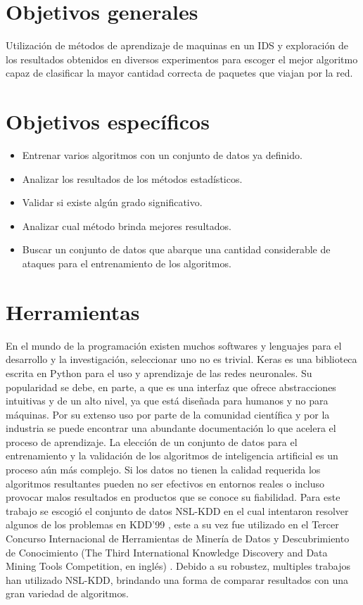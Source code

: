 \section*{Objetivos generales}
Utilización de métodos de aprendizaje de maquinas en un IDS y exploración de los resultados obtenidos en diversos experimentos para escoger el mejor algoritmo capaz de clasificar la mayor cantidad correcta de paquetes que viajan por la red.

\section*{Objetivos específicos}
\begin{itemize}
    \item Entrenar varios algoritmos con un conjunto de datos ya definido.
    \item Analizar los resultados de los métodos estadísticos.
    \item Validar si existe algún grado significativo.
    \item Analizar cual método brinda mejores resultados.
    \item Buscar un conjunto de datos que abarque una cantidad considerable de ataques para el entrenamiento de los algoritmos.
\end{itemize}

\section*{Herramientas}
En el mundo de la programación existen muchos softwares y lenguajes para el desarrollo y la investigación, seleccionar uno no es trivial. Keras \cite{gulli2017deep} es una biblioteca escrita en Python \cite{lutz2001programming} para el uso y aprendizaje de las redes neuronales. Su popularidad se debe, en parte, a que es una interfaz que ofrece abstracciones intuitivas y de un alto nivel, ya que está diseñada para humanos y no para máquinas. Por su extenso uso por parte de la comunidad científica y por la industria se puede encontrar una abundante documentación lo que acelera el proceso de aprendizaje. La elección de un conjunto de datos para el entrenamiento y la validación de los algoritmos de inteligencia artificial es un proceso aún más complejo. Si los datos no tienen la calidad requerida los algoritmos resultantes pueden no ser efectivos en entornos reales o incluso provocar malos resultados en productos que se conoce su fiabilidad. Para este trabajo se escogió el conjunto de datos NSL-KDD \cite{dhanabal2015study} en el cual intentaron resolver algunos de los problemas en KDD'99 \cite{tavallaee2009detailed}, este a su vez fue utilizado en el Tercer Concurso Internacional de Herramientas de Minería de Datos y Descubrimiento de Conocimiento (The Third International Knowledge Discovery and Data Mining Tools Competition, en inglés) \cite{stolfocost}. Debido a su robustez, multiples trabajos han utilizado NSL-KDD, brindando una forma de comparar resultados con una gran variedad de algoritmos.

